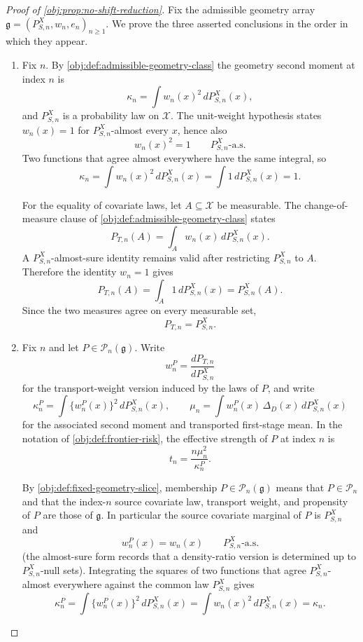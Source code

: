 \begin{proof}[Proof of \cref{obj:prop:no-shift-reduction}]
Fix the admissible geometry array \(\mathfrak g=(P_{S,n}^X,w_n,e_n)_{n\ge1}\). We prove the three asserted conclusions in the order in which they appear.

\begin{enumerate}
\item Fix \(n\).  By \cref{obj:def:admissible-geometry-class} the geometry second moment at index \(n\) is
\[
\kappa_n
=
\int w_n(x)^2\,dP_{S,n}^X(x),
\]
and \(P_{S,n}^X\) is a probability law on \(\mathcal X\).
The unit-weight hypothesis states \(w_n(x)=1\) for \(P_{S,n}^X\)-almost every \(x\), hence also
\[
w_n(x)^2=1
\qquad
P_{S,n}^X\text{-a.s.}
\]
Two functions that agree almost everywhere have the same integral, so
\[
\kappa_n
=
\int w_n(x)^2\,dP_{S,n}^X(x)
=
\int 1\,dP_{S,n}^X(x)
=
1 .
\]

For the equality of covariate laws, let \(A\subseteq\mathcal X\) be measurable.  The change-of-measure clause of \cref{obj:def:admissible-geometry-class} states
\[
P_{T,n}(A)
=
\int_A w_n(x)\,dP_{S,n}^X(x).
\]
A \(P_{S,n}^X\)-almost-sure identity remains valid after restricting \(P_{S,n}^X\) to \(A\).  Therefore the identity \(w_n=1\) gives
\[
P_{T,n}(A)
=
\int_A 1\,dP_{S,n}^X(x)
=
P_{S,n}^X(A).
\]
Since the two measures agree on every measurable set,
\[
P_{T,n}=P_{S,n}^X .
\]

\item Fix \(n\) and let \(P\in\mathcal P_n(\mathfrak g)\).  Write
\[
w_n^P=\frac{dP_{T,n}}{dP_{S,n}^X}
\]
for the transport-weight version induced by the laws of \(P\), and write
\[
\kappa_n^P
=
\int \bigl\{w_n^P(x)\bigr\}^2\,dP_{S,n}^X(x),
\qquad
\mu_n
=
\int w_n^P(x)\,\Delta_D(x)\,dP_{S,n}^X(x)
\]
for the associated second moment and transported first-stage mean.  In the notation of \cref{obj:def:frontier-risk}, the effective strength of \(P\) at index \(n\) is
\[
t_n
=
\frac{n\mu_n^2}{\kappa_n^P}.
\]

By \cref{obj:def:fixed-geometry-slice}, membership \(P\in\mathcal P_n(\mathfrak g)\) means that \(P\in\mathcal P_n\) and that the index-\(n\) source covariate law, transport weight, and propensity of \(P\) are those of \(\mathfrak g\).  In particular the source covariate marginal of \(P\) is \(P_{S,n}^X\) and
\[
w_n^P(x)=w_n(x)
\qquad
P_{S,n}^X\text{-a.s.}
\]
(the almost-sure form records that a density-ratio version is determined up to \(P_{S,n}^X\)-null sets).  Integrating the squares of two functions that agree \(P_{S,n}^X\)-almost everywhere against the common law \(P_{S,n}^X\) gives
\[
\kappa_n^P
=
\int \bigl\{w_n^P(x)\bigr\}^2\,dP_{S,n}^X(x)
=
\int w_n(x)^2\,dP_{S,n}^X(x)
=
\kappa_n .
\]


\end{enumerate}
\end{proof}
